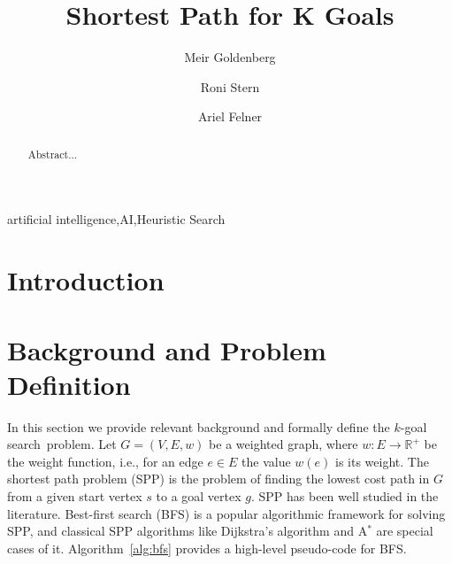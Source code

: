 \documentclass{aicom2e}
\newcommand{\kgs}{$k$-goal search}
\newcommand{\astar}{A$^*$}
\begin{document}
\begin{frontmatter}                           %
%
\title{Shortest Path for K Goals}
\maketitle
%
\author[]{Meir Goldenberg}
\address{Lev Academic Center\\ Jerusalem, Israel\\
	E-mail: mgoldenbe@gmail.com}
\author[]{Roni Stern}
\address{Ben Gurion University of the Negev\\ Be'er Sheva, Israel\\
E-mail: roni.stern@gmail.com}
\author[]{Ariel Felner}
\address{Ben Gurion University of the Negev\\ Be'er Sheva, Israel\\
	E-mail: felner@bgu.ac.il}

\begin{abstract}
Abstract...

\end{abstract}

\begin{keyword}
artificial intelligence\sep AI\sep Heuristic Search
\end{keyword}
%
\end{frontmatter}

\section*{Introduction}


\section{Background and Problem Definition}

In this section we provide relevant background and formally define the \kgs\ problem. 
Let $G=(V,E,w)$ be a weighted graph, where $w:E\rightarrow \mathbb{R}^+$ be the weight function, i.e., for an edge $e\in E$ the value $w(e)$ is its weight. 
The shortest path problem (SPP) is the problem of finding the lowest cost path in $G$ from a given start vertex $s$ to a goal vertex $g$. SPP has been well studied in the literature. Best-first search (BFS) is a popular algorithmic framework for solving SPP, and classical SPP algorithms like Dijkstra's algorithm and \astar{} are special cases of it. Algorithm~\ref{alg:bfs} provides a high-level pseudo-code for BFS. 
\end{document}
